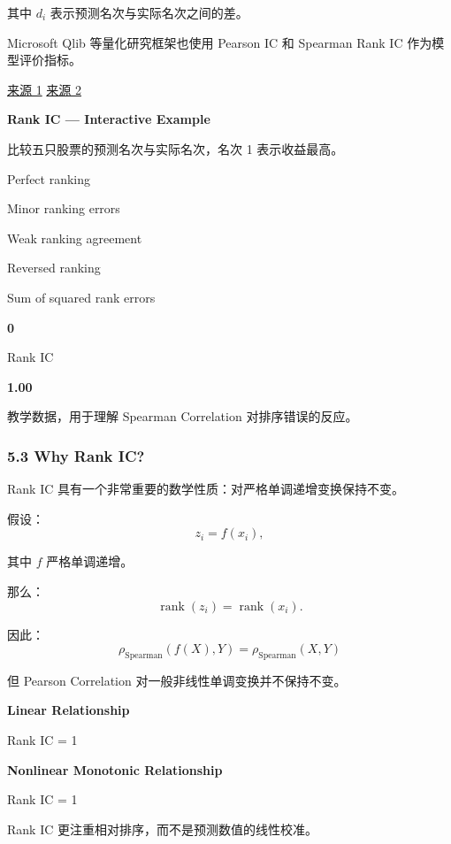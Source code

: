 其中 \(d_i\) 表示预测名次与实际名次之间的差。

Microsoft Qlib 等量化研究框架也使用 Pearson IC 和 Spearman Rank IC 作为模型评价指标。

\href{https://qlib.readthedocs.io/en/stable/component/report.html}{来源 1} \href{https://github.com/microsoft/qlib/blob/main/docs/component/report.rst}{来源 2}

\textbf{Rank IC --- Interactive Example}

比较五只股票的预测名次与实际名次，名次 1 表示收益最高。

Perfect ranking

Minor ranking errors

Weak ranking agreement

Reversed ranking


Sum of squared rank errors

\textbf{0}

Rank IC

\textbf{1.00}

教学数据，用于理解 Spearman Correlation 对排序错误的反应。

\hypertarget{part-4-63-0001-why-rank-ic}{%
\subsubsection{5.3 Why Rank IC?}\label{part-4-63-0001-why-rank-ic}}

Rank IC 具有一个非常重要的数学性质：对严格单调递增变换保持不变。

假设：
\[z_i=f(x_i),\]

其中 \(f\) 严格单调递增。

那么：
\[\operatorname{rank}(z_i)
=
\operatorname{rank}(x_i).\]

因此：
\[\boxed{
\rho_{\mathrm{Spearman}}(f(X),Y)
=
\rho_{\mathrm{Spearman}}(X,Y)
}\]

但 Pearson Correlation 对一般非线性单调变换并不保持不变。

\textbf{Linear Relationship}


Rank IC = 1

\textbf{Nonlinear Monotonic Relationship}


Rank IC = 1

Rank IC 更注重相对排序，而不是预测数值的线性校准。

